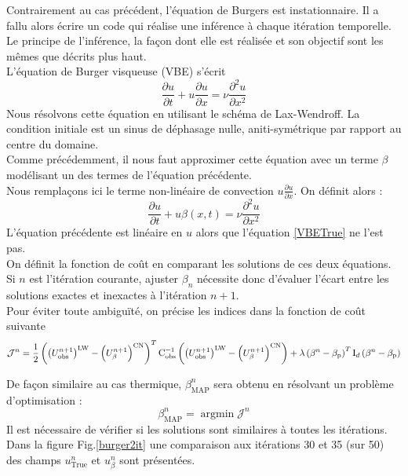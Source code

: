 \documentclass[a4paper,12pt]{article}
\newcommand{\argmin}{\mathop{\mathrm{argmin}}}
\newcommand{\bepar}[1]{
	\left( #1 \right)  
}
\newcommand{\bmap}{\beta_{\text{MAP}}}
\numberwithin{equation}{section} %
\begin{document}
\noindent Contrairement au cas précédent, l'équation de Burgers est instationnaire. Il a fallu alors écrire un code qui réalise une inférence à chaque itération temporelle. Le principe de l'inférence, la façon dont elle est réalisée et son objectif sont les mêmes que décrits plus haut.\\
\noindent L'équation de Burger visqueuse (VBE) s'écrit 
\begin{equation}
\frac{\partial u}{\partial t} + u \frac{\partial u}{\partial x} = \nu\frac{\partial^2 u}{\partial x^2}  \label{VBETrue} \tag{VBE}
\end{equation}
Nous résolvons cette équation en utilisant le schéma de Lax-Wendroff. La condition initiale est un sinus de déphasage nulle, aniti-symétrique par rapport au centre du domaine.\\
Comme précédemment, il nous faut approximer cette équation avec un terme $\beta$ modélisant un des termes de l'équation précédente. \\
Nous remplaçons ici le terme non-linéaire de convection $\displaystyle u \frac{\partial u}{\partial x}$. On définit alors :
\begin{equation}
\frac{\partial u}{\partial t} + u \beta(x,t) = \nu \frac{\partial^2 u}{\partial x^2} \label{VBEbeta} \tag{VBE$\beta$}
\end{equation}
L'équation précédente est linéaire en $u$ alors que l'équation \eqref{VBETrue} ne l'est pas.\\
On définit la fonction de coût en comparant les solutions de ces deux équations. Si $n$ est l'itération courante, ajuster $\beta_n$ nécessite donc d'évaluer l'écart entre les solutions exactes et inexactes à l'itération $n+1$.\\
Pour éviter toute ambiguïté, on précise les indices dans la fonction de coût suivante 
\begin{equation}
\mathcal{J}^n = \frac{1}{2} \bepar{\bepar{U^{n+1}_{\text{obs}}}^\text{LW} - \bepar{U^{n+1}_\beta}^\text{CN}}^T \text{C}_\text{obs}^{-1} \bepar{\bepar{U^{n+1}_{\text{obs}}}^\text{LW} - \bepar{U^{n+1}_\beta}^\text{CN}} + \\ \lambda \bepar{\beta^n -
			\beta_{\text{p}}}^T \text{I}_d \bepar{\beta^n - \beta_\text{p}}
\end{equation}

\vspace{5mm}
\noindent De façon similaire au cas thermique, $\bmap^{n}$ sera obtenu en résolvant un problème d'optimisation :
\begin{equation}
\beta_{\text{MAP}}^n = \argmin \mathcal{J}^n
\end{equation}
Il est nécessaire de vérifier si les solutions sont similaires à toutes les itérations. Dans la figure Fig.\eqref{burger2it} une comparaison aux itérations 30 et 35 (sur 50) des champs $u^n_{\text{True}}$ et $u^n_{\beta}$ sont présentées. \\
\end{document}
